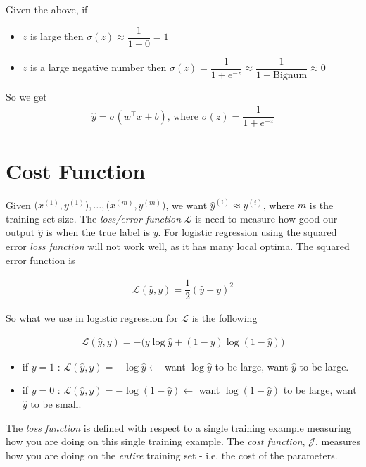 \documentclass[12pt,reqno]{book}      %
\begin{document}
Given the above, if
\begin{itemize}
	\item $z$ is large then $\sigma(z) \approx \dfrac{1}{1 + 0} = 1$
    \item $z$ is a large negative number then $\sigma(z) = \dfrac{1}{1 + e^{-z}} \approx \dfrac{1}{1 + \text{Bignum}} \approx 0$
\end{itemize}

So we get
\begin{align}
\hat{y} = \sigma(w^\intercal x + b) \text{, where } \sigma(z) = \dfrac{1}{1 + e^{-z}}
\end{align}


\section{Cost Function}
Given $\big( x^{(1)}, y^{(1)} \big),\dots{} , \big( x^{(m)}, y^{(m)} \big)$, we want $\hat{y}^{(i)} \approx y^{(i)}$, where $m$ is the training set size. The \textit{loss/error function} $\mathscr{L}$ is need to measure how good our output $\hat{y}$ is when the true label is $y$.  For logistic regression using the squared error  \textit{loss function} will not work well, as it has many local optima. The squared error function is 

\begin{align}
\mathscr{L}(\hat{y}, y) = \dfrac{1}{2} (\hat{y} - y)^{2}
\end{align}

So what we use in logistic regression for $\mathscr{L}$ is the following

\begin{align}
\mathscr{L}(\hat{y}, y) = - \big( y \log \hat{y} + (1 - y) \log  (1 - \hat{y}) \big)
\end{align}

\begin{itemize}
	\item if $y = 1$ : $\mathscr{L}(\hat{y}, y) = - \log \hat{y} \leftarrow$ want $\log \hat{y}$ to be large, want $\hat{y}$ to be large.
	\item if $ y= 0$ : $\mathscr{L}(\hat{y}, y) = - \log (1 - \hat{y}) \leftarrow$ want $\log (1 - \hat{y})$ to be large, want $\hat{y}$ to be small.
\end{itemize}

The \textit{loss function} is defined with respect to a single training example measuring how you are doing on this single training example. The \textit{cost function}, $\mathscr{J}$, measures how you are doing on the \textit{entire} training set - i.e. the cost of the parameters. 
\end{document}
